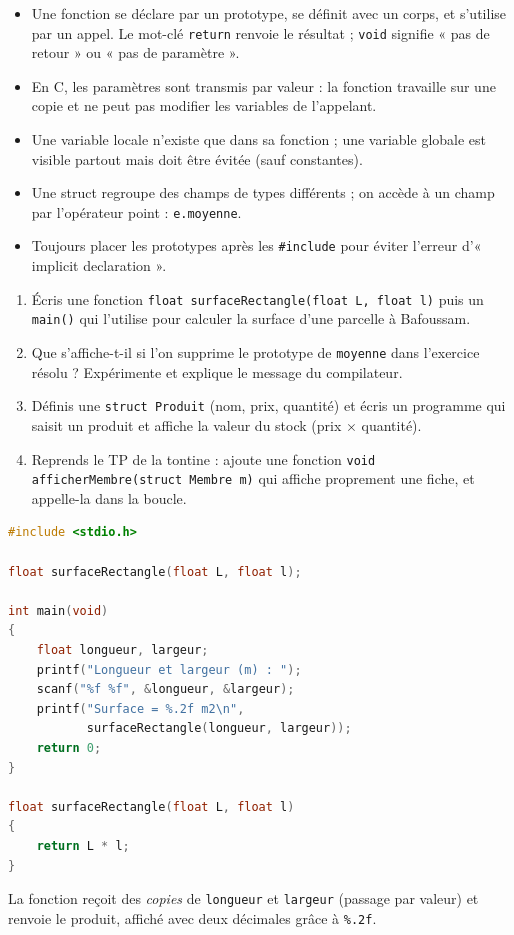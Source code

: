 \documentclass[11pt]{article}
\newcommand{\cle}[1]{{\popxbold\color{popdark}#1}}
\begin{document}
\begin{aretenir}
\begin{itemize}
  \item Une fonction se déclare par un \cle{prototype}, se définit avec un corps, et s'utilise par un \cle{appel}. Le mot-clé \texttt{return} renvoie le résultat ; \texttt{void} signifie « pas de retour » ou « pas de paramètre ».
  \item En C, les paramètres sont transmis \cle{par valeur} : la fonction travaille sur une copie et ne peut pas modifier les variables de l'appelant.
  \item Une variable \cle{locale} n'existe que dans sa fonction ; une variable \cle{globale} est visible partout mais doit être évitée (sauf constantes).
  \item Une \cle{struct} regroupe des champs de types différents ; on accède à un champ par l'opérateur point : \texttt{e.moyenne}.
  \item Toujours placer les prototypes après les \texttt{\#include} pour éviter l'erreur d'« implicit declaration ».
\end{itemize}
\end{aretenir}

\begin{exercice}
\begin{enumerate}
  \item Écris une fonction \texttt{float surfaceRectangle(float L, float l)} puis un \texttt{main()} qui l'utilise pour calculer la surface d'une parcelle à Bafoussam.
  \item Que s'affiche-t-il si l'on supprime le prototype de \texttt{moyenne} dans l'exercice résolu ? Expérimente et explique le message du compilateur.
  \item Définis une \texttt{struct Produit} (nom, prix, quantité) et écris un programme qui saisit un produit et affiche la valeur du stock (prix $\times$ quantité).
  \item Reprends le TP de la tontine : ajoute une fonction \texttt{void afficherMembre(struct Membre m)} qui affiche proprement une fiche, et appelle-la dans la boucle.
\end{enumerate}
\end{exercice}

\begin{corrige}[Exercice n°1]
\begin{lstlisting}[language=C]
#include <stdio.h>

float surfaceRectangle(float L, float l);

int main(void)
{
    float longueur, largeur;
    printf("Longueur et largeur (m) : ");
    scanf("%f %f", &longueur, &largeur);
    printf("Surface = %.2f m2\n",
           surfaceRectangle(longueur, largeur));
    return 0;
}

float surfaceRectangle(float L, float l)
{
    return L * l;
}
\end{lstlisting}
La fonction reçoit des \emph{copies} de \texttt{longueur} et \texttt{largeur} (passage par valeur) et renvoie le produit, affiché avec deux décimales grâce à \texttt{\%.2f}.
\end{corrige}
\end{document}
